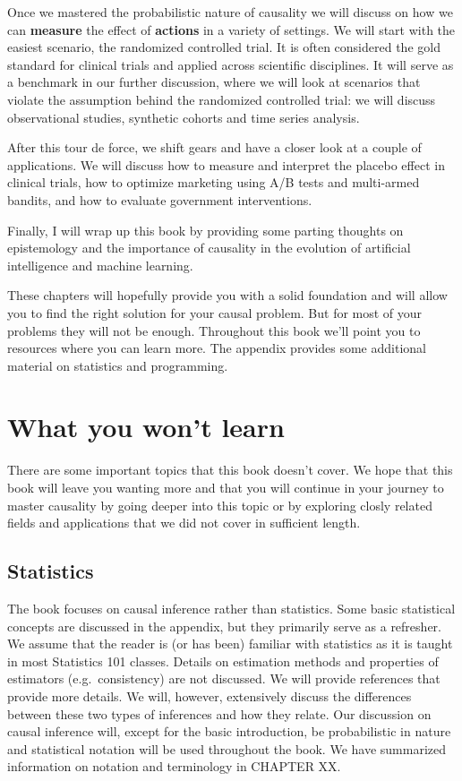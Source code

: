 \documentclass[
]{book}
\theoremstyle{definition}
\theoremstyle{definition}
\theoremstyle{definition}
\theoremstyle{remark}
\begin{document}
Once we mastered the probabilistic nature of causality we will discuss on how we can \textbf{measure} the effect of \textbf{actions} in a variety of settings. We will start with the easiest scenario, the randomized controlled trial. It is often considered the gold standard for clinical trials and applied across scientific disciplines. It will serve as a benchmark in our further discussion, where we will look at scenarios that violate the assumption behind the randomized controlled trial: we will discuss observational studies, synthetic cohorts and time series analysis.

After this tour de force, we shift gears and have a closer look at a couple of applications. We will discuss how to measure and interpret the placebo effect in clinical trials, how to optimize marketing using A/B tests and multi-armed bandits, and how to evaluate government interventions.

Finally, I will wrap up this book by providing some parting thoughts on epistemology and the importance of causality in the evolution of artificial intelligence and machine learning.

These chapters will hopefully provide you with a solid foundation and will allow you to find the right solution for your causal problem. But for most of your problems they will not be enough. Throughout this book we'll point you to resources where you can learn more. The appendix provides some additional material on statistics and programming.

\hypertarget{what-you-wont-learn}{%
\section{What you won't learn}\label{what-you-wont-learn}}

There are some important topics that this book doesn't cover. We hope that this book will leave you wanting more and that you will continue in your journey to master causality by going deeper into this topic or by exploring closly related fields and applications that we did not cover in sufficient length.

\hypertarget{statistics}{%
\subsection{Statistics}\label{statistics}}

The book focuses on causal inference rather than statistics. Some basic statistical concepts are discussed in the appendix, but they primarily serve as a refresher. We assume that the reader is (or has been) familiar with statistics as it is taught in most Statistics 101 classes. Details on estimation methods and properties of estimators (e.g.~consistency) are not discussed. We will provide references that provide more details.
We will, however, extensively discuss the differences between these two types of inferences and how they relate. Our discussion on causal inference will, except for the basic introduction, be probabilistic in nature and statistical notation will be used throughout the book. We have summarized information on notation and terminology in CHAPTER XX.
\end{document}
